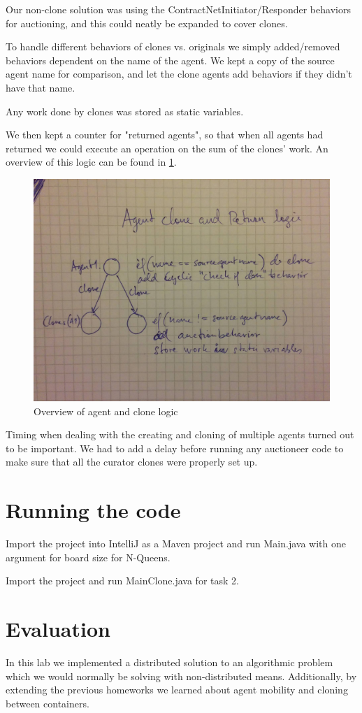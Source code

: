 \documentclass[a4paper, 11pt]{article}
\begin{document}
Our non-clone solution was using the ContractNetInitiator/Responder behaviors for auctioning, and this could neatly be expanded to cover clones.

To handle different behaviors of clones vs. originals we simply added/removed behaviors dependent on the name of the agent. We kept a copy of the source agent name for comparison, and let the clone agents add behaviors if they didn't have that name.

Any work done by clones was stored as static variables.

We then kept a counter for "returned agents", so that when all agents had returned we could execute an operation on the sum of the clones' work. An overview of this logic can be found in \ref{fig:results1}.
\begin{figure}
	\begin{center}
		\includegraphics[width=\textwidth]{agentclonelogic.jpg}
		\caption{Overview of agent and clone logic }
		\label{fig:results1}
	\end{center}
\end{figure}

Timing when dealing with the creating and cloning of multiple agents turned out to be important. We had to add a delay before running any auctioneer code to make sure that all the curator clones were properly set up. 

\section{Running the code}
Import the project into IntelliJ as a Maven project and run Main.java with one argument for board size for N-Queens.

Import the project and run MainClone.java for task 2. 
\section{Evaluation}
In this lab we implemented a distributed solution to an algorithmic problem which we would normally be solving with non-distributed means. Additionally, by extending the previous homeworks we learned about agent mobility and cloning between containers.
\end{document}
